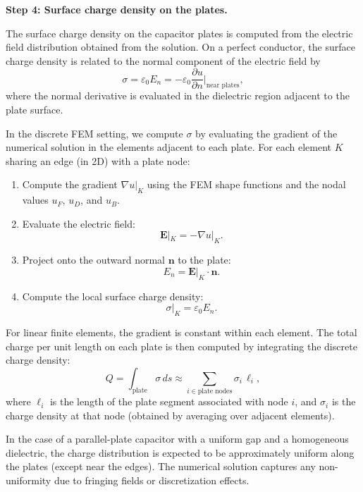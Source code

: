 \documentclass[11pt,onecolumn]{article}
\begin{document}
{\color{cyan} \textbf{Step 4: Surface charge density on the plates.}
\label{sec:charge_density}

The surface charge density on the capacitor plates is computed from the electric field distribution obtained from the solution. On a perfect conductor, the surface charge density is related to the normal component of the electric field by
\begin{equation}
\sigma = \varepsilon_0 E_n = -\varepsilon_0 \frac{\partial u}{\partial n}\bigg|_{\text{near plates}},
\end{equation}
where the normal derivative is evaluated in the dielectric region adjacent to the plate surface.

In the discrete FEM setting, we compute $\sigma$ by evaluating the gradient of the numerical solution in the elements adjacent to each plate. For each element $K$ sharing an edge (in 2D) with a plate node:

\begin{enumerate}
    \item Compute the gradient $\nabla u|_K$ using the FEM shape functions and the nodal values $u_F$, $u_D$, and $u_B$.
    
    \item Evaluate the electric field:
    \[
    \mathbf{E}|_K = -\nabla u|_K .
    \]
    
    \item Project onto the outward normal $\mathbf{n}$ to the plate:
    \[
    E_n = \mathbf{E}|_K \cdot \mathbf{n}.
    \]
    
    \item Compute the local surface charge density:
    \[
    \sigma|_K = \varepsilon_0 E_n .
    \]
\end{enumerate}

For linear finite elements, the gradient is constant within each element. The total charge per unit length on each plate is then computed by integrating the discrete charge density:
\begin{equation}
Q = \int_{\text{plate}} \sigma\, ds 
\approx 
\sum_{i \in \text{plate nodes}} \sigma_i\, \ell_i ,
\end{equation}
where $\ell_i$ is the length of the plate segment associated with node $i$, and $\sigma_i$ is the charge density at that node (obtained by averaging over adjacent elements).

In the case of a parallel-plate capacitor with a uniform gap and a homogeneous dielectric, the charge distribution is expected to be approximately uniform along the plates (except near the edges). The numerical solution captures any non-uniformity due to fringing fields or discretization effects.
}
\end{document}
